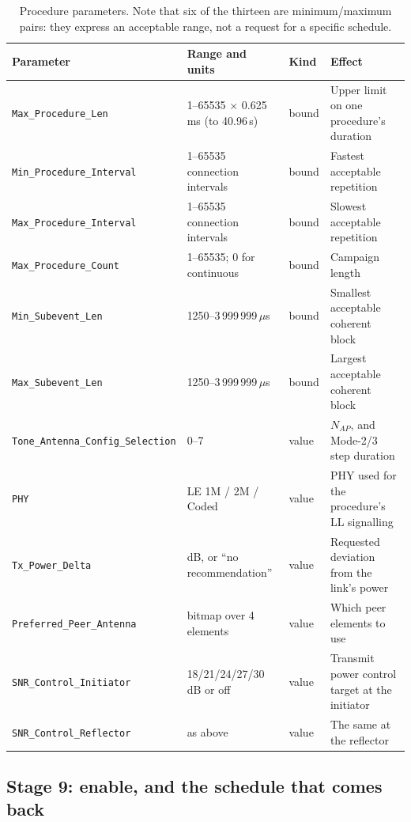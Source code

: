 \documentclass[11pt,a4paper]{article}
\newcommand{\us}{\,\ensuremath{\upmu}s}
\newcommand{\code}[1]{\texttt{\small #1}}
\newcommand{\Nap}{N_{AP}}
\providecommand{\upmu}{\mu}
\begin{document}
\begin{table}[h]
\caption{Procedure parameters. Note that six of the thirteen are minimum/maximum pairs: they express
an acceptable range, not a request for a specific schedule.}
\label{tab:procparams}
\centering\small
\begin{tabular}{@{}L{42mm}L{34mm}L{18mm}L{40mm}@{}}
\toprule
Parameter & Range and units & Kind & Effect \\
\midrule
\code{Max\_Procedure\_Len} & 1--65535 $\times$ 0.625\,ms (to 40.96\,s) & bound & Upper limit on one procedure's duration \\
\code{Min\_Procedure\_Interval} & 1--65535 connection intervals & bound & Fastest acceptable repetition \\
\code{Max\_Procedure\_Interval} & 1--65535 connection intervals & bound & Slowest acceptable repetition \\
\code{Max\_Procedure\_Count} & 1--65535; 0 for continuous & bound & Campaign length \\
\code{Min\_Subevent\_Len} & 1250--3\,999\,999\us & bound & Smallest acceptable coherent block \\
\code{Max\_Subevent\_Len} & 1250--3\,999\,999\us & bound & Largest acceptable coherent block \\
\code{Tone\_Antenna\_}\newline\code{Config\_Selection} & 0--7 & value & $\Nap$, and Mode-2/3 step duration \\
\code{PHY} & LE 1M / 2M / Coded & value & PHY used for the procedure's LL signalling \\
\code{Tx\_Power\_Delta} & dB, or ``no recommendation'' & value & Requested deviation from the link's power \\
\code{Preferred\_Peer\_Antenna} & bitmap over 4 elements & value & Which peer elements to use \\
\code{SNR\_Control\_Initiator} & 18/21/24/27/30\,dB or off & value & Transmit power control target at the initiator \\
\code{SNR\_Control\_Reflector} & as above & value & The same at the reflector \\
\bottomrule
\end{tabular}
\end{table}

\subsection{Stage 9: enable, and the schedule that comes back}
\label{sec:config-enable}
\end{document}
